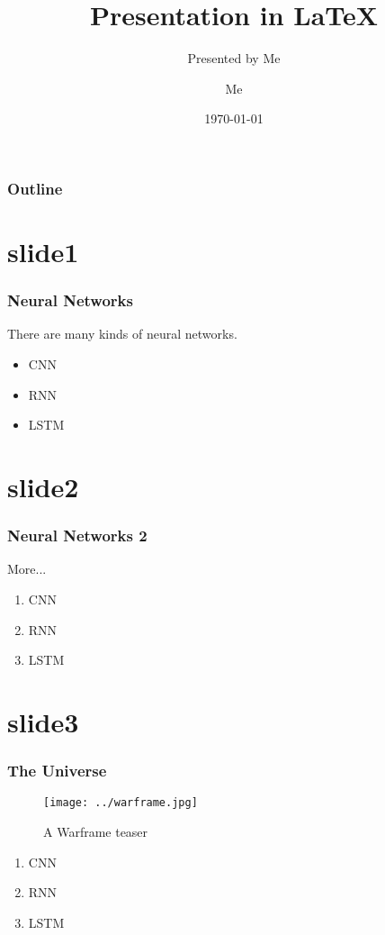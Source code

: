 \documentclass[xcolor=dvipsnames]{beamer}
\title[pre]{Presentation in \LaTeX}
\subtitle[pre by me]{Presented by Me}
\author[me]{Me}
\date[2018]{\today}
\institute[Univ]{My University}
\begin{document}
        \begin{frame}[t]
            \titlepage
        \end{frame}

        \begin{frame}[t]
            \frametitle{Outline}
            \tableofcontents
        \end{frame}

        \section{slide1}
        \begin{frame}[t]
            \frametitle{Neural Networks}
            There are many kinds of neural networks.
            \begin{itemize}
                \item CNN
                \item RNN
                \item LSTM
            \end{itemize}
        \end{frame}

        \section{slide2}
        \begin{frame}[t]
            \frametitle{Neural Networks 2}
            More...
            \begin{enumerate}
                \item CNN
                \item RNN
                \item LSTM
            \end{enumerate}
        \end{frame}

        \section{slide3}
        \begin{frame}[t]
            \frametitle{The Universe}
            \begin{figure}[h!]
                \centering
                \texttt{[image: ../warframe.jpg]}
                \caption{A Warframe teaser}
                \label{universe}
                \pause
            \end{figure}
            \begin{enumerate}
                \item CNN
                \item RNN
                \item LSTM
            \end{enumerate}
        \end{frame}
\end{document}
